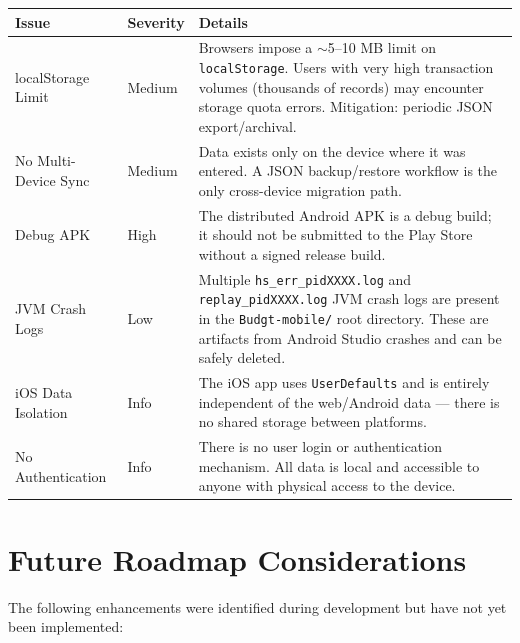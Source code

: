 \documentclass[12pt, a4paper]{article}
\begin{document}
\begin{longtable}{L{3cm} C{2cm} L{9.5cm}}
  \toprule
  \textbf{Issue} & \textbf{Severity} & \textbf{Details} \\
  \midrule
  \endhead
  localStorage Limit & Medium & Browsers impose a $\sim$5--10 MB limit on \texttt{localStorage}. Users with very high transaction volumes (thousands of records) may encounter storage quota errors. Mitigation: periodic JSON export/archival. \\[4pt]
  No Multi-Device Sync & Medium & Data exists only on the device where it was entered. A JSON backup/restore workflow is the only cross-device migration path. \\[4pt]
  Debug APK & High & The distributed Android APK is a debug build; it should not be submitted to the Play Store without a signed release build. \\[4pt]
  JVM Crash Logs & Low & Multiple \texttt{hs\_err\_pidXXXX.log} and \texttt{replay\_pidXXXX.log} JVM crash logs are present in the \texttt{Budgt-mobile/} root directory. These are artifacts from Android Studio crashes and can be safely deleted. \\[4pt]
  iOS Data Isolation & Info & The iOS app uses \texttt{UserDefaults} and is entirely independent of the web/Android data --- there is no shared storage between platforms. \\[4pt]
  No Authentication & Info & There is no user login or authentication mechanism. All data is local and accessible to anyone with physical access to the device. \\
  \bottomrule
\end{longtable}

\section{Future Roadmap Considerations}

The following enhancements were identified during development but have not yet been implemented:
\end{document}
